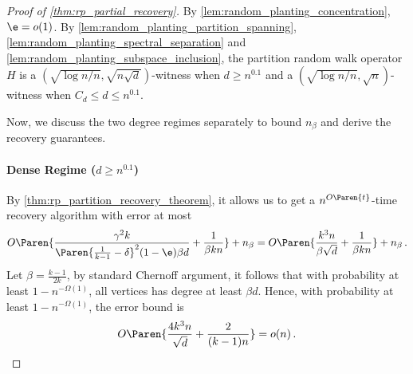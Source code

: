 \begin{proof}[Proof of \cref{thm:rp_partial_recovery}]
    By \cref{lem:random_planting_concentration}, $\e = o(1)$. By \cref{lem:random_planting_partition_spanning}, \cref{lem:random_planting_spectral_separation} and \cref{lem:random_planting_subspace_inclusion}, the partition random walk operator $H$ is a $(\sqrt{\log n/n}, \sqrt{n \sqrt{d}})$-witness when $d \geq n^{0.1}$ and a $(\sqrt{\log n/n}, \sqrt{n})$-witness when $C_d \leq d \leq n^{0.1}$.

    Now, we discuss the two degree regimes separately to bound $n_{\beta}$ and derive the recovery guarantees.

    \paragraph{Dense Regime ($d \geq n^{0.1}$)}
    By \cref{thm:rp_partition_recovery_theorem}, it allows us to get a $n^{O\Paren{t}}$-time recovery algorithm with error at most
    \begin{equation*}
        O \Paren{\frac{\gamma^2 k}{\Paren{\frac{1}{k-1} - \delta}^2 (1-\e) \beta d} + \frac{1}{\beta k n}} + n_{\beta}
        = O \Paren{\frac{k^3 n}{\beta \sqrt{d}} + \frac{1}{\beta k n}} + n_{\beta} \,.
    \end{equation*}
    Let $\beta = \frac{k-1}{2k}$, by standard Chernoff argument, it follows that with probability at least $1-n^{-\Omega(1)}$, all vertices has degree at least $\beta d$.
    Hence, with probability at least $1-n^{-\Omega(1)}$, the error bound is
    \begin{equation*}
        O \Paren{\frac{4 k^3 n}{\sqrt{d}} + \frac{2}{(k-1) n}}
        = o(n) \,.
    \end{equation*}


\end{proof}
